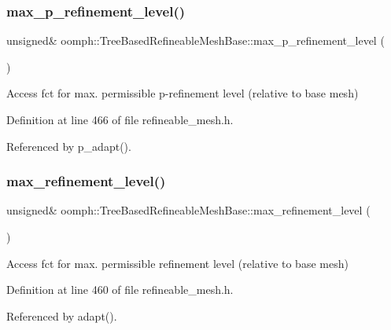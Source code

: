\subsubsection{\texorpdfstring{max\+\_\+p\+\_\+refinement\+\_\+level()}{max\_p\_refinement\_level()}}
{\footnotesize\ttfamily unsigned\& oomph\+::\+Tree\+Based\+Refineable\+Mesh\+Base\+::max\+\_\+p\+\_\+refinement\+\_\+level (\begin{DoxyParamCaption}{ }\end{DoxyParamCaption})\hspace{0.3cm}{\ttfamily [inline]}}



Access fct for max. permissible p-\/refinement level (relative to base mesh) 



Definition at line 466 of file refineable\+\_\+mesh.\+h.



Referenced by p\+\_\+adapt().

\mbox{\label{classoomph_1_1TreeBasedRefineableMeshBase_a18bf22913dc5daf45fb3995d9ec30bfc}} 
\subsubsection{\texorpdfstring{max\+\_\+refinement\+\_\+level()}{max\_refinement\_level()}}
{\footnotesize\ttfamily unsigned\& oomph\+::\+Tree\+Based\+Refineable\+Mesh\+Base\+::max\+\_\+refinement\+\_\+level (\begin{DoxyParamCaption}{ }\end{DoxyParamCaption})\hspace{0.3cm}{\ttfamily [inline]}}



Access fct for max. permissible refinement level (relative to base mesh) 



Definition at line 460 of file refineable\+\_\+mesh.\+h.



Referenced by adapt().

\mbox{\label{classoomph_1_1TreeBasedRefineableMeshBase_a42486bb8abcb77663adc361eaa442a3b}} 
